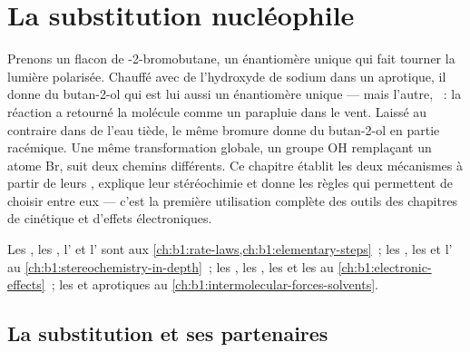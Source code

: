 \chapter{La substitution nucléophile}\label{ch:b1:nucleophilic-substitution}

Prenons un flacon de -2-bromobutane, un énantiomère unique qui
fait tourner la lumière polarisée. Chauffé avec de l'hydroxyde de sodium
dans un  aprotique, il donne du butan-2-ol qui est lui
aussi un énantiomère unique --- mais l'autre, ~: la réaction a
retourné la molécule comme un parapluie dans le vent. Laissé au contraire
dans de l'eau tiède, le même bromure donne du butan-2-ol en partie
racémique. Une même transformation globale, un groupe OH remplaçant un
atome Br, suit deux chemins différents. Ce chapitre établit les deux
mécanismes à partir de leurs , explique leur
stéréochimie et donne les règles qui permettent de choisir entre eux ---
c'est la première utilisation complète des outils des chapitres de
cinétique et d'effets électroniques.

\begin{recall}
Les , les , l' et l' sont aux
\cref{ch:b1:rate-laws,ch:b1:elementary-steps}~; les , les
 et l' au
\cref{ch:b1:stereochemistry-in-depth}~; les , les
, les  et les  au
\cref{ch:b1:electronic-effects}~; les  et aprotiques
au \cref{ch:b1:intermolecular-forces-solvents}.
\end{recall}

\section{La substitution et ses partenaires}

